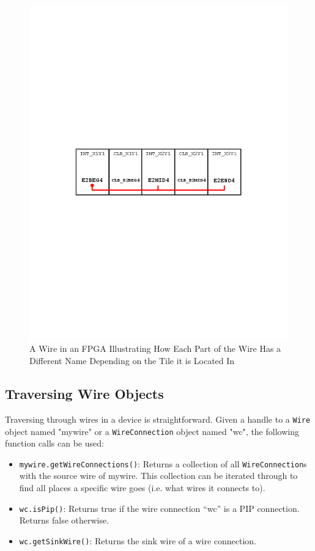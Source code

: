\documentclass[12pt]{article}
\newcommand{\cls}[1]{{\texttt{#1}}}
\begin{document}
\begin{figure}[H]
\centering
\includegraphics[width=0.8\columnwidth]{wireFigure}
\caption{A Wire in an FPGA Illustrating How Each Part of the Wire Has a
Different Name Depending on the Tile it is Located In}
\label{fig:wireFigure}
\end{figure}

\subsection{Traversing Wire Objects}
Traversing through wires in a device is straightforward. Given a handle to a
\cls{Wire} object named "mywire" or a \cls{WireConnection} object named
"wc", the following function calls can be used:

\begin {itemize}
  \item \texttt{mywire.getWireConnections()}: Returns a collection of all
  \cls{WireConnection}s with the source wire of mywire. This collection can be
  iterated through to find all places a specific wire goes (i.e. what wires it
  connects to).
  \item  \texttt{wc.isPip()}: Returns true if the wire connection ``wc'' is a PIP
  connection. Returns false otherwise.
  \item \texttt{wc.getSinkWire()}: Returns the sink wire of a wire connection.
\end{itemize} 
\end{document}
